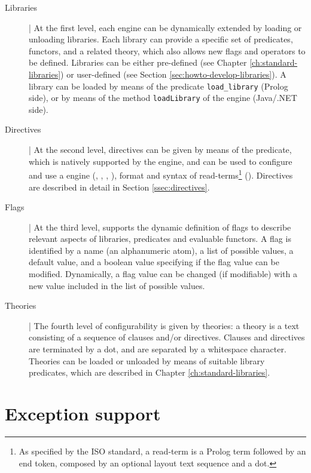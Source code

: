 \begin{description}

\item[Libraries] |
At the first level, each \tuprolog{} engine can be dynamically extended by loading or unloading libraries.
%
Each library can provide a specific set of predicates, functors, and a related theory, which also allows new flags and operators to be defined.
%
Libraries can be either pre-defined (see Chapter \ref{ch:standard-libraries}) or user-defined (see Section \ref{sec:howto-develop-libraries}).
%
A library can be loaded by means of the predicate \texttt{load\_library} (Prolog side), or by means of the method \texttt{loadLibrary} of the \tuprolog{} engine (Java/.NET side).


\item[Directives] |
At the second level, directives can be given by means of the  predicate, which is natively supported by the engine, and can be used to configure and use a \tuprolog{} engine (, , , ), format and syntax of read-terms\footnote{As specified by the ISO standard, a read-term is a Prolog term followed by an end token, composed by an optional layout text sequence and a dot.} ().
%
Directives are described in detail in Section \ref{ssec:directives}.

\item[Flags] |
At the third level, \tuprolog{} supports the dynamic definition of flags to describe relevant aspects of libraries, predicates and evaluable functors.
%
A flag is identified by a name (an alphanumeric atom), a list of possible values, a default value, and a boolean value specifying if the flag value can be modified.
%
Dynamically, a flag value can be changed (if modifiable) with a new value included in the list of possible values.

\item[Theories] |
The fourth level of configurability is given by theories: a theory is a text consisting of a sequence of clauses and/or directives.
%
Clauses and directives are terminated by a dot, and are separated by a whitespace character.
%
Theories can be loaded or unloaded by means of suitable library predicates, which are described in Chapter \ref{ch:standard-libraries}.

\end{description}

\section{Exception support}
\label{sec:exception-support}

